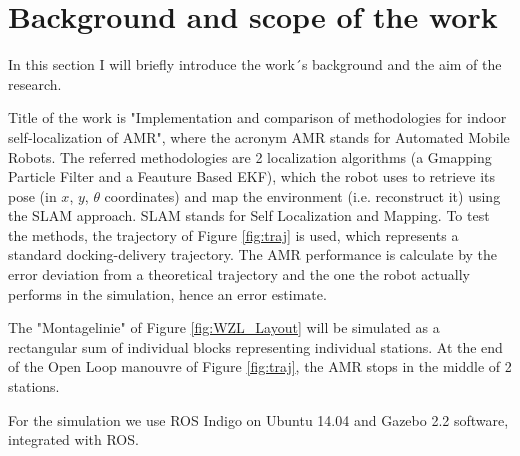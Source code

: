 \documentclass[11pt,a4paper]{article}
\begin{document}

%
%



\section{Background and scope of the work}
In this section I will briefly introduce the work´s background and the aim of the research.

Title of the work is "Implementation and comparison of methodologies for indoor self-localization of AMR", where the acronym AMR stands for Automated Mobile Robots. The referred methodologies are 2 localization algorithms (a Gmapping Particle Filter and a Feauture Based EKF), which the robot uses to retrieve its pose (in $x$, $y$, $\theta$ coordinates) and map the environment (i.e. reconstruct it) using the SLAM approach. SLAM stands for Self Localization and Mapping. To test the methods, the trajectory of Figure \ref{fig:traj} is used, which represents a standard docking-delivery trajectory. The AMR performance is calculate by the error deviation from a theoretical trajectory and the one the robot actually performs in the simulation, hence an error estimate. 

The "Montagelinie" of Figure \ref{fig:WZL_Layout} will be simulated as a rectangular sum of individual blocks representing individual stations. At the end of the Open Loop manouvre of Figure \ref{fig:traj}, the AMR stops in the middle of 2 stations.

For the simulation we use ROS Indigo on Ubuntu 14.04 and Gazebo 2.2 software, integrated with ROS.
\end{document}
